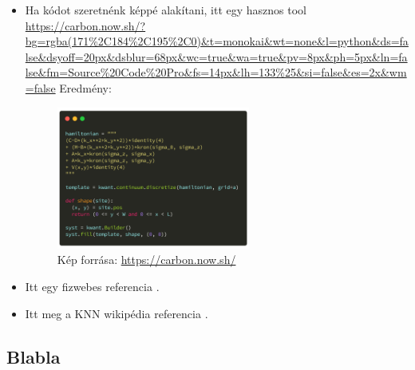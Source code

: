 \documentclass[12pt]{article}
\theoremstyle{plain}
\begin{document}
\begin{itemize}
    \item Ha kódot szeretnénk képpé alakítani, itt egy hasznos tool \url{https://carbon.now.sh/?bg=rgba(171%2C184%2C195%2C0)&t=monokai&wt=none&l=python&ds=false&dsyoff=20px&dsblur=68px&wc=true&wa=true&pv=8px&ph=5px&ln=false&fm=Source%20Code%20Pro&fs=14px&lh=133%25&si=false&es=2x&wm=false}
    Eredmény:
    \begin{figure}[h!]
        \begin{center}
        \includegraphics[width=0.6\textwidth]{media/hamilton_def.png}
        \caption{Kép forrása: \url{https://carbon.now.sh/}} 
        \end{center}
    \end{figure}
    \item Itt egy fizwebes referencia \cite{fizweb}.
    \item Itt meg a KNN wikipédia referencia \cite{knnwiki}.
\end{itemize}

\subsection{Blabla}



\end{document}
